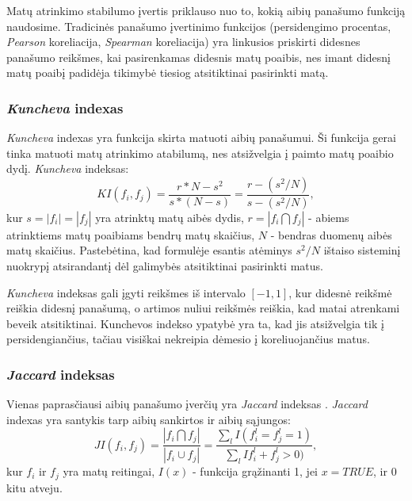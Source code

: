 Matų atrinkimo stabilumo įvertis priklauso nuo to, kokią aibių panašumo funkciją naudosime. Tradicinės panašumo įvertinimo funkcijos (persidengimo procentas, \textit{Pearson} koreliacija, \textit{Spearman} koreliacija) yra linkusios priskirti didesnes panašumo reikšmes, kai pasirenkamas didesnis matų poaibis, nes imant didesnį matų poaibį padidėja tikimybė tiesiog atsitiktinai pasirinkti matą.

\subsubsection{\textit{Kuncheva} indexas}

\textit{Kuncheva} indexas \cite{DBLP:conf/aia/Kuncheva07} yra funkcija skirta matuoti aibių panašumui. Ši funkcija gerai tinka matuoti matų atrinkimo atabilumą, nes atsižvelgia į paimto matų poaibio dydį. \textit{Kuncheva} indeksas:
\begin{equation}
\label{kuncheva_index}
 KI(f_i, f_j)=\frac{r*N - s^2}{s*(N-s)}=\frac{r - (s^2/N)}{s - (s^2/N)},
\end{equation}		
kur $s=|f_i|=|f_j|$ yra atrinktų matų aibės dydis, $r=|f_i \bigcap f_j|$ - abiems atrinktiems matų poaibiams bendrų matų skaičius, $N$ - bendras  duomenų aibės matų skaičius. Pastebėtina, kad formulėje esantis atėminys $s^2/N$ ištaiso sisteminį nuokrypį atsirandantį dėl galimybės atsitiktinai pasirinkti matus. 

\textit{Kuncheva} indeksas gali įgyti reikšmes iš intervalo $[-1, 1]$, kur didesnė reikšmė reiškia didesnį panašumą, o artimos nuliui reikšmės reiškia, kad matai atrenkami beveik atsitiktinai. Kunchevos indekso ypatybė yra ta, kad jis atsižvelgia tik į persidengiančius, tačiau visiškai nekreipia dėmesio į koreliuojančius matus.

\subsubsection{\textit{Jaccard} indeksas}

Vienas paprasčiausi aibių panašumo įverčių yra \textit{Jaccard} indeksas \cite{jaccard1901etude}. \textit{Jaccard} indexas yra santykis tarp aibių sankirtos ir aibių sąjungos:
\begin{equation}
\label{jaccard_index}
 JI(f_i, f_j)=\frac{|f_i \bigcap f_j|}{|f_i \cup f_j|}=\frac{\sum_{l}I(f_i^l=f_j^l=1)}{\sum_{l}I{f_i^l+f_j^l > 0)}}, 
\end{equation}
kur $f_i$ ir $f_j$ yra matų reitingai, $I(x)$ - funkcija grąžinanti 1, jei $x=TRUE$, ir 0 kitu atveju.

